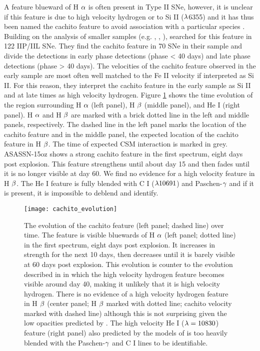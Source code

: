 \documentclass[a4paper,fleqn,usenatbib]{mnras}
\begin{document}
A feature blueward of H $\rm{\alpha}$ is often present in Type II SNe, however, it is unclear if this feature is due to high velocity hydrogen or to Si II ($\rm{\lambda}$6355)
and it has thus been named the cachito feature to avoid association with a particular species \citep{2017gutierrez}.
Building on the analysis of smaller samples (e.g. \citealt{2001leonard}, \citet{2013inserra}, \citealt{2014valenti}), \citet{2017gutierrez} searched for this feature in 122 IIP/IIL SNe. 
They find the cachito feature in 70 SNe in their sample and divide the detections in early phase detections (phase < 40 days) and late phase detections (phase > 40 days).
The velocities of the cachito feature observed in the early sample are most often well matched to the Fe II velocity if interpreted as Si II. 
For this reason, they interpret the cachito feature in the early sample as Si II and at late times as high velocity hydrogen.
Figure \ref{fig:CachitoEvolve} shows the time evolution of the region surrounding H $\rm{\alpha}$ (left panel), H $\rm{\beta}$ (middle panel), and He I (right panel).
H $\rm{\alpha}$ and H $\rm{\beta}$ are marked with a brick dotted line in the left and middle panels, respectively.
The dashed line in the left panel marks the location of the cachito feature and in the middle panel, the expected location of the cachito feature in H $\rm{\beta}$.
The time of expected CSM interaction is marked in grey.
ASASSN-15oz shows a strong cachito feature in the first spectrum, eight days post explosion. 
This feature strengthens until about day 15 and then fades until it is no longer visible at day 60. 
We find no evidence for a high velocity feature in H $\rm{\beta}$.
The He I feature is fully blended with C I ($\rm{\lambda 10691}$) and Paschen-$\rm{\gamma}$ and if it is present, it is impossible to deblend and identify.
\begin{figure}
\begin{center}
\texttt{[image: cachito\_evolution]}
\caption{The evolution of the cachito feature (left panel; dashed line) over time. 
The feature is visible bluewards of H $\rm{\alpha}$ (left panel; dotted line)  in the first spectrum, eight days post explosion.
It increases in strength for the next 10 days, then decreases until it is barely visible at 60 days post explosion.
This evolution is counter to the evolution described in \citet{2007chugai} in which the high velocity hydrogen feature becomes visible around day 40, making it unlikely that it is high velocity hydrogen.
There is no evidence of a high velocity hydrogen feature in H $\rm{\beta}$ (center panel; H $\rm{\beta}$ marked with dotted line; cachito velocity marked with dashed line) although this is not surprising given the low opacities predicted by \citet{2007chugai}.
The high velocity He I ($\rm{\lambda=10830}$) feature (right panel) also predicted by the models of \citet{2007chugai} is too heavily blended with the Paschen-$\rm{\gamma}$ and C I lines to be identifiable.}
\label{fig:CachitoEvolve}
\end{center}
\end{figure}
\end{document}
